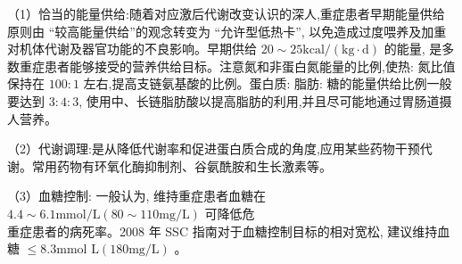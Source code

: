 \documentclass[10pt]{article}
\begin{document}
（1）恰当的能量供给:随着对应激后代谢改变认识的深人,重症患者早期能量供给原则由 “较高能量供给”的观念转变为 “允许型低热卡”, 以免造成过度喂养及加重对机体代谢及器官功能的不良影响。早期供给 $20 \sim 25 \mathrm{kcal} /(\mathrm{kg} \cdot \mathrm{d})$ 的能量, 是多数重症患者能够接受的营养供给目标。注意氮和非蛋白氮能量的比例,使热: 氮比值保持在 $100: 1$ 左右,提高支链氨基酸的比例。蛋白质: 脂肪: 糖的能量供给比例一般要达到 $3: 4: 3$, 使用中、长链脂肪酸以提高脂肪的利用,并且尽可能地通过胃肠道摄人营养。

（2）代谢调理:是从降低代谢率和促进蛋白质合成的角度,应用某些药物干预代谢。常用药物有环氧化酶抑制剂、谷氨酰胺和生长激素等。

（3）血糖控制: 一般认为, 维持重症患者血糖在 $4.4 \sim 6.1 \mathrm{mmol} / \mathrm{L}(80 \sim 110 \mathrm{mg} / \mathrm{L})$ 可降低危\\
重症患者的病死率。2008 年 SSC 指南对于血糖控制目标的相对宽松, 建议维持血糖 $\leqslant 8.3 \mathrm{mmol}$ $\mathrm{L}(180 \mathrm{mg} / \mathrm{L})$ 。
\end{document}

